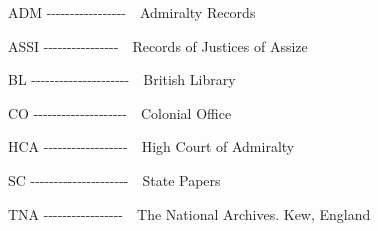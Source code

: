 \begin{styleStandard}
ADM -{}-{}-{}-{}-{}-{}-{}-{}-{}-{}-{}-{}-{}-{}-{}-{}-\ \ Admiralty Records
\end{styleStandard}


\begin{styleStandard}
ASSI -{}-{}-{}-{}-{}-{}-{}-{}-{}-{}-{}-{}-{}-{}-{}-\ \ Records of Justices of Assize
\end{styleStandard}


\begin{styleStandard}
BL -{}-{}-{}-{}-{}-{}-{}-{}-{}-{}-{}-{}-{}-{}-{}-{}-{}-{}-{}-{}-\ \ British Library
\end{styleStandard}


\begin{styleStandard}
CO -{}-{}-{}-{}-{}-{}-{}-{}-{}-{}-{}-{}-{}-{}-{}-{}-{}-{}-{}-\ \ Colonial Office
\end{styleStandard}


\begin{styleStandard}
HCA -{}-{}-{}-{}-{}-{}-{}-{}-{}-{}-{}-{}-{}-{}-{}-{}-{}-\ \ High Court of Admiralty
\end{styleStandard}


\begin{styleStandard}
SC -{}-{}-{}-{}-{}-{}-{}-{}-{}-{}-{}-{}-{}-{}-{}-{}-{}-{}-{}-{}-\ \ State Papers
\end{styleStandard}


\begin{styleStandard}
TNA -{}-{}-{}-{}-{}-{}-{}-{}-{}-{}-{}-{}-{}-{}-{}-{}-\ \ The National Archives. Kew, England
\end{styleStandard}


